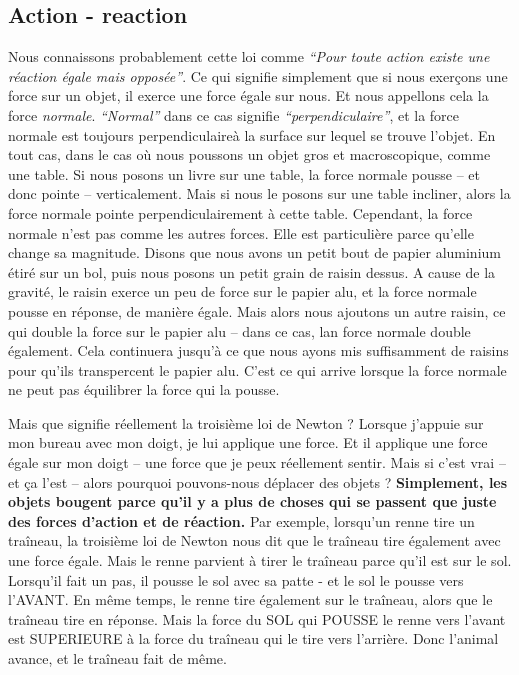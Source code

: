 \documentclass[a4paper, twoside]{article}
\begin{document}
\hypertarget{action---reaction}{%
\subsection{Action - reaction}\label{action---reaction}}

Nous connaissons probablement cette loi comme \emph{``Pour toute action
existe une réaction égale mais opposée''}. Ce qui signifie simplement
que si nous exerçons une force sur un objet, il exerce une force égale
sur nous. Et nous appellons cela la force \emph{normale}.
\emph{``Normal''} dans ce cas signifie \emph{``perpendiculaire''}, et la
force normale est toujours perpendiculaireà la surface sur lequel se
trouve l'objet. En tout cas, dans le cas où nous poussons un objet gros
et macroscopique, comme une table. Si nous posons un livre sur une
table, la force normale pousse -- et donc pointe -- verticalement. Mais
si nous le posons sur une table incliner, alors la force normale pointe
perpendiculairement à cette table. Cependant, la force normale n'est pas
comme les autres forces. Elle est particulière parce qu'elle change sa
magnitude. Disons que nous avons un petit bout de papier aluminium étiré
sur un bol, puis nous posons un petit grain de raisin dessus. A cause de
la gravité, le raisin exerce un peu de force sur le papier alu, et la
force normale pousse en réponse, de manière égale. Mais alors nous
ajoutons un autre raisin, ce qui double la force sur le papier alu --
dans ce cas, lan force normale double également. Cela continuera jusqu'à
ce que nous ayons mis suffisamment de raisins pour qu'ils transpercent
le papier alu. C'est ce qui arrive lorsque la force normale ne peut pas
équilibrer la force qui la pousse.

Mais que signifie réellement la troisième loi de Newton ? Lorsque
j'appuie sur mon bureau avec mon doigt, je lui applique une force. Et il
applique une force égale sur mon doigt -- une force que je peux
réellement sentir. Mais si c'est vrai -- et ça l'est -- alors pourquoi
pouvons-nous déplacer des objets ? \textbf{Simplement, les objets
bougent parce qu'il y a plus de choses qui se passent que juste des
forces d'action et de réaction.} Par exemple, lorsqu'un renne tire un
traîneau, la troisième loi de Newton nous dit que le traîneau tire
également avec une force égale. Mais le renne parvient à tirer le
traîneau parce qu'il est sur le sol. Lorsqu'il fait un pas, il pousse le
sol avec sa patte - et le sol le pousse vers l'AVANT. En même temps, le
renne tire également sur le traîneau, alors que le traîneau tire en
réponse. Mais la force du SOL qui POUSSE le renne vers l'avant est
SUPERIEURE à la force du traîneau qui le tire vers l'arrière. Donc
l'animal avance, et le traîneau fait de même.
\end{document}
